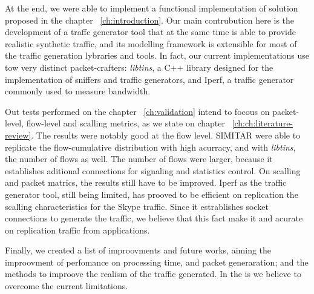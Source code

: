 At the end, we were able to implement a functional implementation of solution proposed in the chapter ~\ref{ch:introduction}. Our main contrubution here is the development of a traffc generator tool that at the same time is able to provide realistic synthetic traffic, and its modelling framework is extensible for most of the traffic generation lybraries and tools. In fact, our current implementations use tow very distinct packet-crafters: \textit{libtins}, a C++ library designed for the implementation of sniffers and traffic generators, and Iperf, a traffic generator commonly used to measure bandwidth. 

Out tests performed on the chapter ~\ref{ch:validation} intend to focous on packet-level, flow-level and scalling metrics, as we state on chapter ~\ref{ch:ch:literature-review}. The results were notably good at the flow level. SIMITAR were able to replicate the flow-cumulative distribution with high acurracy, and with \textit{libtins}, the number of flows as well. The number of flows were larger, because it establishes aditional connections for signaling and statistics control. On scalling and packet matrics, the results still have to be improved. Iperf as the traffic generator tool, still being limited, has prooved to be efficient on replication the scalling characteristics for the Skype traffic. Since it estrablishes socket connections to generate the traffic, we believe that this fact make it and acurate on replication traffic from applications. 



Finally, we created a list of improovments and future works, aiming the improovment of perfomance on processing time, and packet generaration; and the methods to improove the realism of the traffic generated. In the is we believe to overcome the current limitations.









